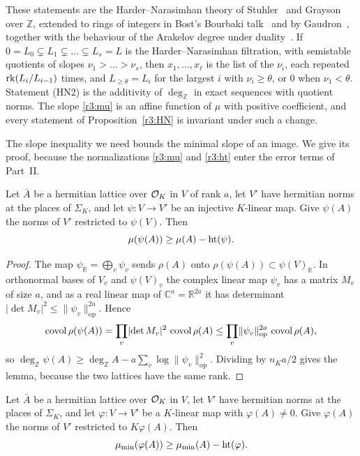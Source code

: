 These statements are the Harder--Narasimhan theory of Stuhler~\cite{r3stuhler} and Grayson~\cite{r3grayson} over $\mathbb Z$, extended to rings of integers in Bost's Bourbaki talk~\cite{bost} and by Gaudron~\cite{r3gaudron}, together with the behaviour of the Arakelov degree under duality~\cite{r3gaudron,r3bostkunnemann}. If $0=L_0\subsetneq L_1\subsetneq\dots\subsetneq L_s=L$ is the Harder--Narasimhan filtration, with semistable quotients of slopes $\nu_1>\dots>\nu_s$, then $x_1,\dots,x_\ell$ is the list of the $\nu_i$, each repeated $\operatorname{rk}(L_i/L_{i-1})$ times, and $L_{\ge\theta}=L_i$ for the largest $i$ with $\nu_i\ge\theta$, or $0$ when $\nu_1<\theta$. Statement (HN2) is the additivity of $\deg_{\mathbb Z}$ in exact sequences with quotient norms. The slope \eqref{r3:mu} is an affine function of $\widehat\mu$ with positive coefficient, and every statement of Proposition~\ref{r3:HN} is invariant under such a change.

The slope inequality we need bounds the minimal slope of an image. We give its proof, because the normalizations \eqref{r3:mu} and \eqref{r3:ht} enter the error terms of Part~II.

\begin{lemma}\label{r3:covol}
Let $\bar A$ be a hermitian lattice over $\mathcal O_K$ in $V$ of rank $a$, let $V'$ have hermitian norms at the places of $\Sigma_K$, and let $\psi\colon V\to V'$ be an injective $K$-linear map. Give $\psi(A)$ the norms of $V'$ restricted to $\psi(V)$. Then
\[
\mu(\psi(A))\ge\mu(A)-\operatorname{ht}(\psi).
\]
\end{lemma}

\begin{proof}
The map $\psi_{\mathbb R}=\bigoplus_v\psi_v$ sends $\rho(A)$ onto $\rho(\psi(A))\subset\psi(V)_{\mathbb R}$. In orthonormal bases of $V_v$ and $\psi(V)_v$ the complex linear map $\psi_v$ has a matrix $M_v$ of size $a$, and as a real linear map of $\mathbb C^a=\mathbb R^{2a}$ it has determinant $\lvert\det M_v\rvert^2\le\lVert\psi_v\rVert_{\mathrm{op}}^{2a}$. Hence
\[
\operatorname{covol}\rho(\psi(A))=\prod_v\lvert\det M_v\rvert^2\,\operatorname{covol}\rho(A)\le\prod_v\lVert\psi_v\rVert_{\mathrm{op}}^{2a}\,\operatorname{covol}\rho(A),
\]
so $\deg_{\mathbb Z}\psi(A)\ge\deg_{\mathbb Z}A-a\sum_v\log\lVert\psi_v\rVert_{\mathrm{op}}^2$. Dividing by $n_Ka/2$ gives the lemma, because the two lattices have the same rank.
\end{proof}

\begin{proposition}\label{r3:SI}
Let $\bar A$ be a hermitian lattice over $\mathcal O_K$ in $V$, let $V'$ have hermitian norms at the places of $\Sigma_K$, and let $\varphi\colon V\to V'$ be a $K$-linear map with $\varphi(A)\ne0$. Give $\varphi(A)$ the norms of $V'$ restricted to $K\varphi(A)$. Then
\[
\mu_{\min}(\varphi(A))\ge\mu_{\min}(A)-\operatorname{ht}(\varphi).
\]
\end{proposition}

